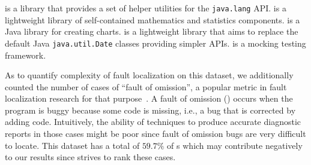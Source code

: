 \documentclass{article}
\begin{document}
\lang{} is a
library that provides a set of helper utilities for the
{\small\texttt{java.lang}} API. \cmath{} is a lightweight library of
self-contained mathematics and statistics components. \chart{}
is a Java library for creating charts.  \jtime{} is a lightweight
library that aims to replace the default Java
{\small\texttt{java.util.Date}} classes providing simpler
APIs. \mockito{} is a mocking testing framework.



As to quantify complexity of fault localization on this dataset, we
additionally counted the number of cases of ``fault of omission'', a
popular metric in fault localization research for that
purpose~\cite{Pearson:2017:EIF:3097368.3097441}. 
A fault of omission (\foo) occurs when
the program is buggy because some code is missing, i.e., a bug that is
corrected by adding code. Intuitively, the ability of techniques to
produce accurate diagnostic reports in those cases might be poor since 
fault of omission bugs are very difficult to locate. This dataset has a
total of $59.7\%$ of \foo s which may contribute negatively to our
results since \sfl{} strives to rank these cases.

\end{document}
